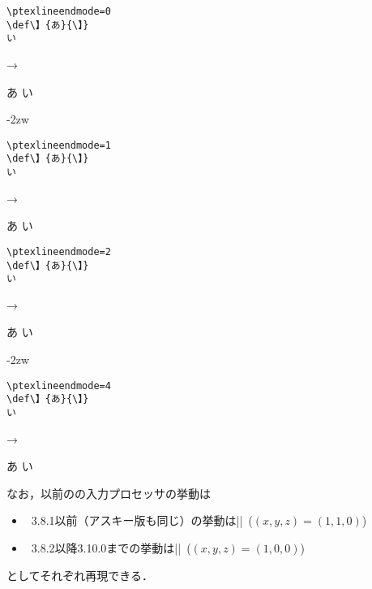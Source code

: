 \documentclass[a4paper,11pt,nomag,dvipdfmx]{jsarticle}
\begin{document}
\begin{dangerous}
\begin{enumerate}
    \medskip
    \begin{minipage}[t]{13zw}
\begin{verbatim}
\ptexlineendmode=0
\def\】{あ}{\】}
い
\end{verbatim}
    \end{minipage}\quad →\quad
    \begin{minipage}[t]{5zw}
\def\】{あ}{\】}
い
    \end{minipage}%
    \hfill\vrule\hfill\kern-2zw
    \begin{minipage}[t]{13zw}
\begin{verbatim}
\ptexlineendmode=1
\def\】{あ}{\】}
い
\end{verbatim}
    \end{minipage}\quad →\quad
    \begin{minipage}[t]{5zw}
\def\】{あ}{\】}
い
    \end{minipage}
    \par\medskip
    \begin{minipage}[t]{13zw}
\begin{verbatim}
\ptexlineendmode=2
\def\】{あ}{\】}
い
\end{verbatim}
    \end{minipage}\quad →\quad
    \begin{minipage}[t]{5zw}
\def\】{あ}{\】}
い
    \end{minipage}%
    \hfill\vrule\hfill\kern-2zw
    \begin{minipage}[t]{13zw}
\begin{verbatim}
\ptexlineendmode=4
\def\】{あ}{\】}
い
\end{verbatim}
    \end{minipage}\quad →\quad
    \begin{minipage}[t]{5zw}
\def\】{あ}{\】}
い
    \end{minipage}
    \medskip
  \end{enumerate}

  なお，以前の\pTeX の入力プロセッサの挙動は
  \begin{itemize}
    \item \pTeX~3.8.1以前（アスキー版も同じ）の挙動は||~($(x,y,z)=(1,1,0)$)
    \item \pTeX~3.8.2以降3.10.0までの挙動は||~($(x,y,z)=(1,0,0)$)
  \end{itemize}
  としてそれぞれ再現できる\cite{tjb87}．

\end{dangerous}
\end{document}
